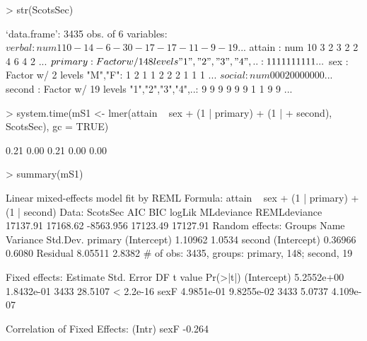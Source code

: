\documentclass[12pt]{article}
\begin{document}
\begin{Schunk}
\begin{Sinput}
> str(ScotsSec)
\end{Sinput}
\begin{Soutput}
`data.frame':	3435 obs. of  6 variables:
 $ verbal : num  11 0 -14 -6 -30 -17 -17 -11 -9 -19 ...
 $ attain : num  10 3 2 3 2 2 4 6 4 2 ...
 $ primary: Factor w/ 148 levels "1","2","3","4",..: 1 1 1 1 1 1 1 1 1 1 ...
 $ sex    : Factor w/ 2 levels "M","F": 1 2 1 1 2 2 2 1 1 1 ...
 $ social : num  0 0 0 20 0 0 0 0 0 0 ...
 $ second : Factor w/ 19 levels "1","2","3","4",..: 9 9 9 9 9 9 1 1 9 9 ...
\end{Soutput}
\begin{Sinput}
> system.time(mS1 <- lmer(attain ~ sex + (1 | primary) + (1 | 
+     second), ScotsSec), gc = TRUE)
\end{Sinput}
\begin{Soutput}
[1] 0.21 0.00 0.21 0.00 0.00
\end{Soutput}
\begin{Sinput}
> summary(mS1)
\end{Sinput}
\begin{Soutput}
Linear mixed-effects model fit by REML
Formula: attain ~ sex + (1 | primary) + (1 | second) 
   Data: ScotsSec 
      AIC      BIC    logLik MLdeviance REMLdeviance
 17137.91 17168.62 -8563.956   17123.49     17127.91
Random effects:
 Groups   Name        Variance Std.Dev.
 primary  (Intercept) 1.10962  1.0534  
 second   (Intercept) 0.36966  0.6080  
 Residual             8.05511  2.8382  
# of obs: 3435, groups: primary, 148; second, 19

Fixed effects:
              Estimate Std. Error   DF t value  Pr(>|t|)
(Intercept) 5.2552e+00 1.8432e-01 3433 28.5107 < 2.2e-16
sexF        4.9851e-01 9.8255e-02 3433  5.0737 4.109e-07

Correlation of Fixed Effects:
     (Intr)
sexF -0.264
\end{Soutput}
\end{Schunk}
\end{document}
